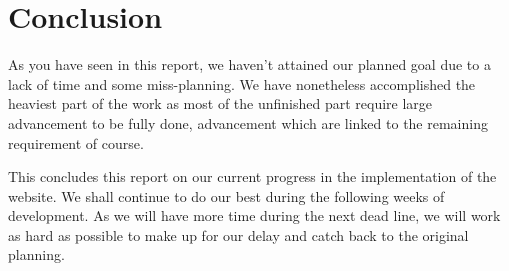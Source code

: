 \section{Conclusion}

As you have seen in this report, we haven't attained our planned goal due to a lack of time and some miss-planning. We have nonetheless accomplished the heaviest part of the work as most of the unfinished part require large advancement to be fully done, advancement which are linked to the remaining requirement of course.  \newline

This concludes this report on our current progress in the implementation of
the website. We shall continue to do our best during the following weeks of development.
As we will have more time during the next dead line, we will work as hard as possible to make up for our delay and catch back to the original planning.